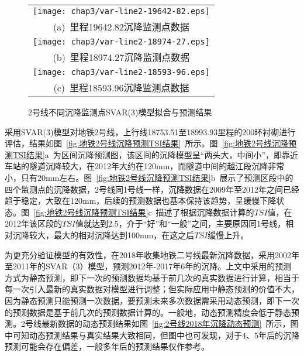 \begin{figure}[htbp] 
    \centering 
    \begin{tabular}{c} 
        \texttt{[image: chap3/var-line2-19642-82.eps]} \\ 
        (a)~里程19642.82沉降监测点数据 \\
        \texttt{[image: chap3/var-line2-18974-27.eps]} \\ 
        (b)~里程18974.27沉降监测点数据 \\
        \texttt{[image: chap3/var-line2-18593-96.eps]} \\ 
        (c)~里程18593.96沉降监测点数据 \\
    \end{tabular}
    \caption{2号线不同沉降监测点SVAR(3)模型拟合与预测结果} 
    \label{fig:2号线不同沉降监测点SVAR3模型拟合与预测结果} 
\end{figure}

采用SVAR(3)模型对地铁2号线，上行线18753.51至18993.93里程的200环衬砌进行评估，结果如图~\ref{fig:地铁2号线沉降预测TSI结果}~所示。图~\ref{fig:地铁2号线沉降预测TSI结果}a~为区间沉降预测图，该区间的沉降模型呈“两头大，中间小”，即靠近车站的隧道沉降较大，在2012年大约在120mm，而隧道中间的越江段沉降非常小，只有20mm左右。图~\ref{fig:地铁2号线沉降预测TSI结果}b~展示了预测区段中的四个监测点的沉降数据，2号线同1号线一样，沉降数据在2009年至2012年之间已经趋于稳定，大致在120mm，后续的预测数据也基本保持该趋势，呈缓慢下降状态。图~\ref{fig:地铁2号线沉降预测TSI结果}c~描述了根据沉降数据计算的$TSI$值，在2012年该区段的$TSI$值就达到2.5，介于“好”和“一般”之间，主要原因同1号线，相对沉降较大，最大的相对沉降达到100mm，在这之后$TSI$缓慢上升。

为更充分验证模型的有效性，在2018年收集地铁二号线最新沉降数据，采用2002年至2011年的SVAR（3）模型，预测2012年-2017年6年的沉降。上文中采用的预测方式为静态预测，即下一次的预测数据均基于前几次的真实数据进行计算，相当于每一次引入最新的真实数据对模型进行调整；但实际应用中静态预测的价值不大，因为静态预测只能预测一次数据，要预测未来多次数据需采用动态预测，即下一次的预测数据是基于前几次的预测数据计算的。一般地，动态预测精度会低于静态预测。2号线最新数据的动态预测结果如图~\ref{fig:2号线2018年沉降动态预测}~所示，图中可知动态预测结果与真实结果大致相同，但图中也可发现，对于4、5年后的沉降预测可能会存在偏差，一般多年后的预测结果仅作参考。

